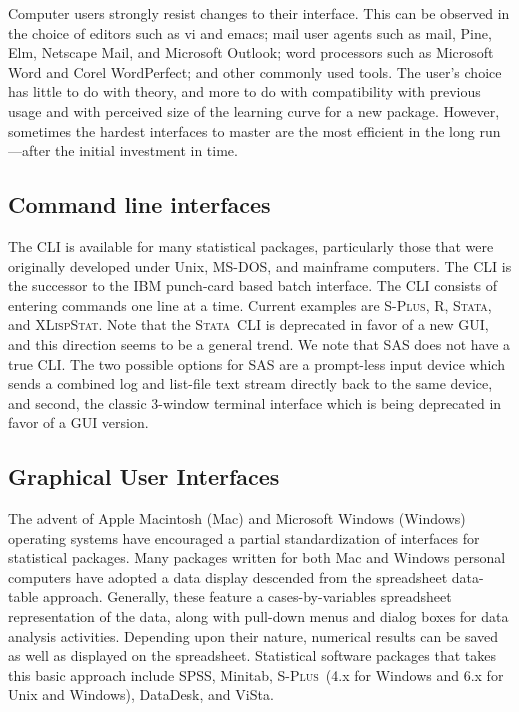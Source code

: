 \documentclass{article}
\newcommand*{\Splus}{\textsc{S-Plus}}
\newcommand*{\XLispStat}{\textsc{XLispStat}}
\newcommand*{\Stata}{\textsc{Stata}}
\begin{document}
Computer users strongly resist changes to their interface.  This can be
observed in the choice of editors such as vi and emacs; mail user agents
such as mail, Pine, Elm, Netscape Mail, and Microsoft Outlook; word
processors such as Microsoft Word and Corel WordPerfect; and other
commonly used tools.  The user's choice has little to do with theory,
and more to do with compatibility with previous usage and with
perceived size of the learning curve for a new package.
However, sometimes the hardest
interfaces to master are the most efficient in the long run---after the
initial investment in time.

\subsection{Command line interfaces}
\label{sec:UI:command}

The CLI is available for many statistical packages, particularly those
that were originally developed under Unix, MS-DOS, and
mainframe computers.  The CLI is the successor to the IBM punch-card
based batch interface.  The CLI consists of entering
commands one line at a time.  Current examples
are \Splus, R, \Stata, and \XLispStat.  Note that
the \Stata\ CLI is deprecated in favor of a new GUI, and this
direction seems to be a general trend.  We note that SAS does not have
a true CLI.  The two possible options for SAS are a prompt-less input
device which sends a combined log and list-file text stream directly
back to the same device, and second, the classic 3-window %
terminal interface which is being deprecated in favor of a GUI
version.

\subsection{Graphical User Interfaces}
\label{sec:UI:GUI}

The advent of Apple Macintosh (Mac) and Microsoft Windows (Windows)
operating systems have encouraged a partial standardization of
interfaces for statistical packages.  Many packages written for both
Mac and Windows personal computers have adopted a data display
descended from the spreadsheet data-table approach.  Generally, these
feature a cases-by-variables spreadsheet representation of the data,
along with pull-down menus and dialog boxes for data analysis
activities.  Depending upon their nature, numerical results can be
saved as well as displayed on the spreadsheet.  Statistical software
packages that takes this basic approach include SPSS, Minitab, \Splus\ 
(4.x for Windows and 6.x for Unix and Windows), DataDesk, and ViSta.
\end{document}
